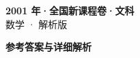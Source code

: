 \documentclass[zihao=-4, a4paper]{ctexart}
\begin{document}
\begin{center}
  {\Large\bfseries 2001 年·全国新课程卷·文科}\\[4pt]
  {\large 数学 · 解析版}
\end{center}
\medskip
{}

\clearpage
{}
\begin{center}{\Large\bfseries 参考答案与详细解析}\end{center}
\medskip

\end{document}

